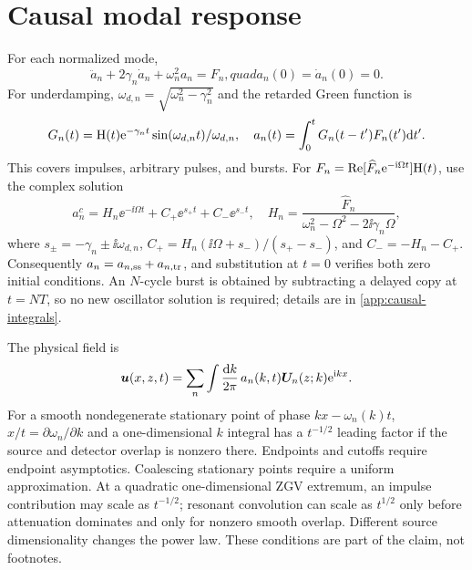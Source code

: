 \chapter{Causal modal response}\label{ch:causal}
For each normalized mode,
\begin{equation}\ddot a_n+2\gamma_n\dot a_n+\omega_n^2a_n=F_n,quad a_n(0)=\dot a_n(0)=0.
\label{eq:modal-ode}\end{equation}
For underdamping, $\omega_{d,n}=\sqrt{\omega_n^2-\gamma_n^2}$ and the retarded
Green function is
\begin{equation}G_n(t)=\mathrm{H}(t)\mathrm{e}^{-\gamma_nt}\sin(\omega_{d,n}t)/\omega_{d,n},
\quad a_n(t)=\int_0^tG_n(t-t')F_n(t')\mathrm{d} t'.\label{eq:modal-green}\end{equation}
This covers impulses, arbitrary pulses, and bursts. For
$F_n=\operatorname{Re}[\widehat F_n\mathrm{e}^{-\mathrm{i}\Omega t}]\mathrm{H}(t)$, use the
complex solution
\begin{equation}
 a_n^c=H_n\ee^{-\ii\Omega t}+C_+\ee^{s_+t}+C_-\ee^{s_-t},
\quad H_n=\frac{\widehat F_n}{\omega_n^2-\Omega^2-2\ii\gamma_n\Omega},
\label{eq:switched-solution}
\end{equation}
where $s_\pm=-\gamma_n\pm\ii\omega_{d,n}$,
$C_+=H_n(\ii\Omega+s_-)/(s_+-s_-)$, and $C_-=-H_n-C_+$. Consequently
$a_n=a_{n,\rm ss}+a_{n,\rm tr}$, and substitution at $t=0$ verifies both zero
initial conditions. An $N$-cycle burst is obtained by subtracting a delayed copy
at $t=NT$, so no new oscillator solution is required; details are in
\cref{app:causal-integrals}.

The physical field is
\begin{equation}
 \bm{u}(x,z,t)=\sum_n\int\frac{\mathrm{d} k}{2\pi}\,
 a_n(k,t)\bm{U}_n(z;k)\mathrm{e}^{\mathrm{i} kx}.\label{eq:field-reconstruction}
\end{equation}
For a smooth nondegenerate stationary point of phase $kx-\omega_n(k)t$,
$x/t=\partial\omega_n/\partial k$ and a one-dimensional $k$ integral has a
$t^{-1/2}$ leading factor if the source and detector overlap is nonzero there.
Endpoints and cutoffs require endpoint asymptotics. Coalescing stationary points
require a uniform approximation. At a quadratic one-dimensional ZGV extremum,
an impulse contribution may scale as $t^{-1/2}$; resonant convolution can scale
as $t^{1/2}$ only before attenuation dominates and only for nonzero smooth
overlap. Different source dimensionality changes the power law. These conditions
are part of the claim, not footnotes.

